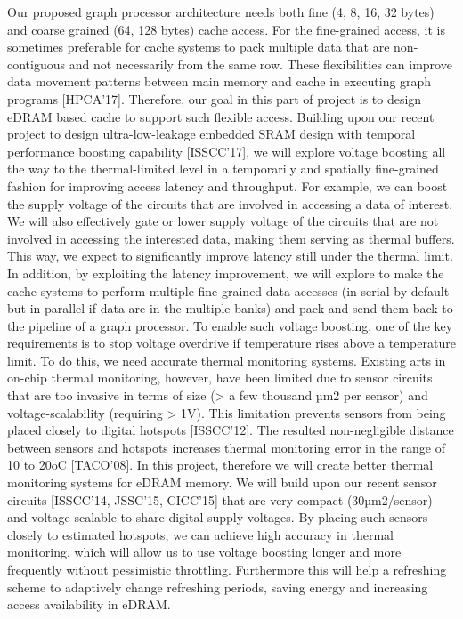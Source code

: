 Our proposed graph processor architecture needs both fine (4, 8, 16, 32 bytes) and coarse grained (64, 128 bytes) cache access. For the fine-grained access, it is sometimes preferable for cache systems to pack multiple data that are non-contiguous and not necessarily from the same row. These flexibilities can improve data movement patterns between main memory and cache in executing graph programs [HPCA’17]. 
Therefore, our goal in this part of project is to design eDRAM based cache to support such flexible access. Building upon our recent project to design ultra-low-leakage embedded SRAM design with temporal performance boosting capability [ISSCC’17], we will explore voltage boosting all the way to the thermal-limited level in a temporarily and spatially fine-grained fashion for improving access latency and throughput. For example, we can boost the supply voltage of the circuits that are involved in accessing a data of interest. We will also effectively gate or lower supply voltage of the circuits that are not involved in accessing the interested data, making them serving as thermal buffers. This way, we expect to significantly improve latency still under the thermal limit. In addition, by exploiting the latency improvement, we will explore to make the cache systems to perform multiple fine-grained data accesses (in serial by default but in parallel if data are in the multiple banks) and pack and send them back to the pipeline of a graph processor. 
To enable such voltage boosting, one of the key requirements is to stop voltage overdrive if temperature rises above a temperature limit. To do this, we need accurate thermal monitoring systems. Existing arts in on-chip thermal monitoring, however, have been limited due to sensor circuits that are too invasive in terms of size (> a few thousand µm2 per sensor) and voltage-scalability (requiring > 1V). This limitation prevents sensors from being placed closely to digital hotspots [ISSCC’12]. The resulted non-negligible distance between sensors and hotspots increases thermal monitoring error in the range of 10 to 20oC [TACO’08]. In this project, therefore we will create better thermal monitoring systems for eDRAM memory. We will build upon our recent sensor circuits [ISSCC’14, JSSC’15, CICC’15] that are very compact (30µm2/sensor) and voltage-scalable to share digital supply voltages. By placing such sensors closely to estimated hotspots, we can achieve high accuracy in thermal monitoring, which will allow us to use voltage boosting longer and more frequently without pessimistic throttling. Furthermore this will help a refreshing scheme to adaptively change refreshing periods, saving energy and increasing access availability in eDRAM. 


